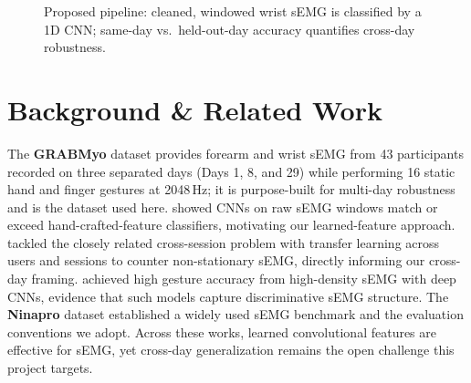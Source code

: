 \documentclass[final]{article}
\begin{document}
\begin{figure}[!h]
  \centering
  \caption{Proposed pipeline: cleaned, windowed wrist sEMG is classified by a 1D CNN; same-day vs.\ held-out-day accuracy quantifies cross-day robustness.}
  \label{fig:pipeline}
\end{figure}

\section*{Background \& Related Work}
The \textbf{GRABMyo} dataset \citep{pradhan2022grabmyo,jiang2022grabmyophysionet} provides forearm and wrist sEMG from 43 participants recorded on three separated days (Days 1, 8, and 29) while performing 16 static hand and finger gestures at 2048\,Hz; it is purpose-built for multi-day robustness and is the dataset used here. \citet{atzori2016deep} showed CNNs on raw sEMG windows match or exceed hand-crafted-feature classifiers, motivating our learned-feature approach. \citet{coteallard2019transfer} tackled the closely related cross-session problem with transfer learning across users and sessions to counter non-stationary sEMG, directly informing our cross-day framing. \citet{geng2016instantaneous} achieved high gesture accuracy from high-density sEMG with deep CNNs, evidence that such models capture discriminative sEMG structure. The \textbf{Ninapro} dataset \citep{atzori2014ninapro} established a widely used sEMG benchmark and the evaluation conventions we adopt. Across these works, learned convolutional features are effective for sEMG, yet cross-day generalization remains the open challenge this project targets.
\end{document}
